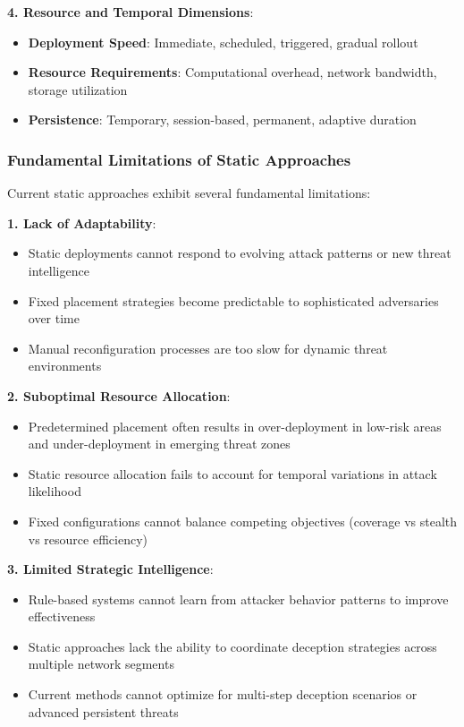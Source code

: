 \documentclass[12pt,twoside]{article}
\theoremstyle{definition}
\theoremstyle{plain}
\begin{document}
\textbf{4. Resource and Temporal Dimensions}:
\begin{itemize}
\item \textbf{Deployment Speed}: Immediate, scheduled, triggered, gradual rollout
\item \textbf{Resource Requirements}: Computational overhead, network bandwidth, storage utilization
\item \textbf{Persistence}: Temporary, session-based, permanent, adaptive duration
\end{itemize}

\subsubsection{Fundamental Limitations of Static Approaches}

Current static approaches exhibit several fundamental limitations:

\textbf{1. Lack of Adaptability}:
\begin{itemize}
\item Static deployments cannot respond to evolving attack patterns or new threat intelligence
\item Fixed placement strategies become predictable to sophisticated adversaries over time
\item Manual reconfiguration processes are too slow for dynamic threat environments
\end{itemize}

\textbf{2. Suboptimal Resource Allocation}:
\begin{itemize}
\item Predetermined placement often results in over-deployment in low-risk areas and under-deployment in emerging threat zones
\item Static resource allocation fails to account for temporal variations in attack likelihood
\item Fixed configurations cannot balance competing objectives (coverage vs stealth vs resource efficiency)
\end{itemize}

\textbf{3. Limited Strategic Intelligence}:
\begin{itemize}
\item Rule-based systems cannot learn from attacker behavior patterns to improve effectiveness
\item Static approaches lack the ability to coordinate deception strategies across multiple network segments
\item Current methods cannot optimize for multi-step deception scenarios or advanced persistent threats
\end{itemize}
\end{document}
